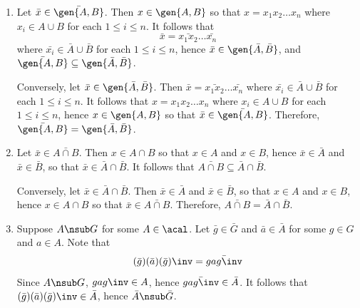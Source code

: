 \begin{sol}[spsol]
\begin{enumerate}
        Suppose $bA \in \ker\psi$.
        Then $\psi(bA) = \bar A$ so that $\bar b \bar A = \bar A$.
        Then $\bar b \in \bar A$, hence $bN \in A/N$, and $b \in A$.
        Then $bA = A$ which is the identity in $B/A$ so that $\ker\psi = 1$, hence $\psi$ is injective.
        To show that $\psi$ is surjective, let $\bar b \bar A \in \bar B/\bar A$ for $\bar b \in B$.
        By definition of $\bar B$, there exists $b \in B$ such that $\bar b = bN$.
        Then $\psi(bA) = \bar b \bar A$, hence $\psi$ is surjective.
        Lastly, for any $b_1A, b_2A \in B/A$,
        \[
        	\psi(b_1A \cdot b_2A) = \psi(b_1b_2A) = \bar{b_1b_2} \bar A = \bar b_1 \bar b_2 \bar A = \psi(b_1A) \cdot \psi(b_2A)
        \]
        so that $\psi$ is a homomorphism.
        Therefore, $\psi$ is an isomorphism and $|B : A| = |B/A| = |\bar B / \bar A| = |\bar B : \bar A|$.
        \item Let $\bar x \in \bar{\gen{A, B}}$.
        Then $x \in \gen{A, B}$ so that $x = x_1x_2 \ldots x_n$ where $x_i \in A \cup B$ for each $1 \leq i \leq n$.
        It follows that
        \[
        	\bar x = \bar{x_1x_2} \ldots \bar{x_n}
        \]
        where $\bar{x_i} \in \bar A \cup \bar B$ for each $1 \leq i \leq n$, hence $\bar x \in \gen{\bar A, \bar B}$, and $\bar{\gen{A, B}} \subseteq \gen{\bar A, \bar B}$. 
        
        Conversely, let $\bar x \in \gen{\bar A, \bar B}$.
        Then $\bar x = \bar{x_1x_2} \ldots \bar{x_n}$ where $\bar{x_i} \in \bar A \cup \bar B$ for each $1 \leq i \leq n$.
        It follows that $x = x_1x_2 \ldots x_n$ where $x_i \in A \cup B$ for each $1 \leq i \leq n$, hence $x \in \gen{A, B}$ so that $\bar x \in \bar{\gen{A, B}}$.
        Therefore, $\bar{\gen{A, B}} = \gen{\bar A, \bar B}$.
        \item Let $\bar x \in \bar{A \cap B}$.
        Then $x \in A \cap B$ so that $x \in A$ and $x \in B$, hence $\bar x \in \bar A$ and $\bar x \in \bar B$, so that $\bar x \in \bar A \cap \bar B$.
        It follows that $\bar{A \cap B} \subseteq \bar A \cap \bar B$.
            
        Conversely, let $\bar x \in \bar A \cap \bar B$.
        Then $\bar x \in \bar A$ and $\bar x \in \bar B$, so that $x \in A$ and $x \in B$, hence $x \in A \cap B$ so that $\bar x \in \bar{A \cap B}$.
        Therefore, $\bar{A \cap B} = \bar A \cap \bar B$.
        \item \rightimp Suppose $A \nsub G$ for some $A \in \acal$.
	    Let $\bar g \in \bar G$ and $\bar a \in \bar A$ for some $g \in G$ and $a \in A$.
	    Note that
        \[
            (\bar g)(\bar a)(\bar g)\inv = \bar{gag\inv}
        \]
        Since $A \nsub G$, $gag\inv \in A$, hence $\bar{gag\inv} \in \bar A$.
	    It follows that $(\bar g)(\bar a)(\bar g)\inv \in \bar A$, hence $\bar A \nsub \bar G$.
        

\end{enumerate}
\end{sol}
